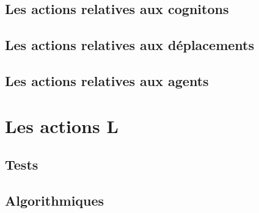 	\subsection{Les actions relatives aux cognitons}
	
	
	\subsection{Les actions relatives aux déplacements}
	

	\subsection{Les actions relatives aux agents}
	
	
\section{Les actions L}

\subsection{Tests}


\subsection{Algorithmiques}




